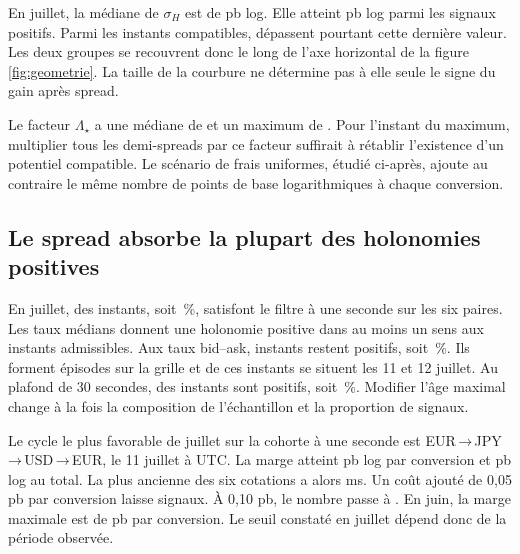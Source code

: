\documentclass[11pt,a4paper]{article}
\theoremstyle{clair}
\newcommand{\arrowfx}{\mathbin{\to}}
\begin{document}
En juillet, la médiane de \(\sigma_H\) est de \HodgeJuilletMed{} pb log. Elle atteint \HodgeJuilletMedPositifs{} pb log parmi les signaux positifs. Parmi les \HodgeJuilletNonPositifs{} instants compatibles, \HodgeJuilletNonPositifsForts{} dépassent pourtant cette dernière valeur. Les deux groupes se recouvrent donc le long de l'axe horizontal de la figure \ref{fig:geometrie}. La taille de la courbure ne détermine pas à elle seule le signe du gain après spread.

Le facteur \(\Lambda_\star\) a une médiane de \DilatationJuilletMed{} et un maximum de \DilatationJuilletMax{}. Pour l'instant du maximum, multiplier tous les demi-spreads par ce facteur suffirait à rétablir l'existence d'un potentiel compatible. Le scénario de frais uniformes, étudié ci-après, ajoute au contraire le même nombre de points de base logarithmiques à chaque conversion.

\clearpage
\subsection{Le spread absorbe la plupart des holonomies positives}

\begin{table}[H]
\centering\small

\caption{Comptages par jour sur la cohorte à une seconde. Les trois colonnes de signes comptent les instants avec au moins un cycle positif selon le test indiqué. $\mu_{\max}$ est la plus grande marge bid--ask de la fenêtre, en pb log par conversion.}
\label{tab:jours}
\end{table}

En juillet, \JuilletEligibles{} des \JuilletGrille{} instants, soit \JuilletEligiblesPct{}\,\%, satisfont le filtre à une seconde sur les six paires. Les taux médians donnent une holonomie positive dans au moins un sens aux \JuilletMed{} instants admissibles. Aux taux bid--ask, \JuilletNet{} instants restent positifs, soit \JuilletNetPct{}\,\%. Ils forment \JuilletEpisodes{} épisodes sur la grille et \JuilletPicDeuxJours{} de ces instants se situent les 11 et 12 juillet. Au plafond de 30 secondes, \JuilletCommunNet{} des \JuilletCommun{} instants sont positifs, soit \JuilletCommunPct{}\,\%. Modifier l'âge maximal change à la fois la composition de l'échantillon et la proportion de signaux.

Le cycle le plus favorable de juillet sur la cohorte à une seconde est EUR\,$\arrowfx$\,JPY\,$\arrowfx$\,USD\,$\arrowfx$\,EUR, le 11 juillet à \JuilletPicHeure{} UTC. La marge atteint \JuilletMarge{} pb log par conversion et \JuilletGainPic{} pb log au total. La plus ancienne des six cotations a alors \JuilletPicAge{} ms. Un coût ajouté de 0,05 pb par conversion laisse \JuilletFeeCinq{} signaux. À 0,10 pb, le nombre passe à \JuilletFeeDix{}. En juin, la marge maximale est de \JuinMarge{} pb par conversion. Le seuil constaté en juillet dépend donc de la période observée.
\end{document}
